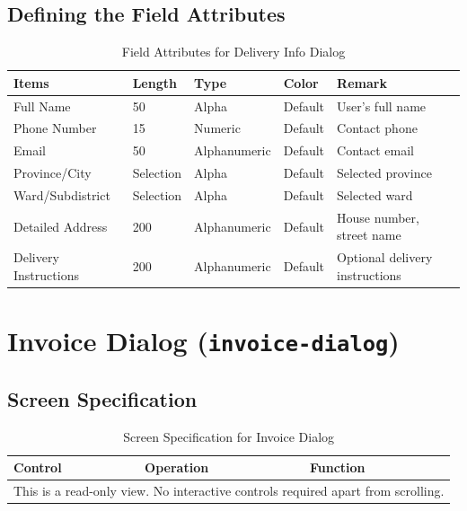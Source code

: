 \documentclass{article}
\begin{document}
\subsection{Defining the Field Attributes}
\begin{table}[h!]
\centering
\begin{tabularx}{\textwidth}{|l|l|l|l|X|}
\hline
\textbf{Items} & \textbf{Length} & \textbf{Type} & \textbf{Color} & \textbf{Remark} \\
\hline
Full Name & 50 & Alpha & Default & User's full name \\
\hline
Phone Number & 15 & Numeric & Default & Contact phone \\
\hline
Email & 50 & Alphanumeric & Default & Contact email \\
\hline
Province/City & Selection & Alpha & Default & Selected province \\
\hline
Ward/Subdistrict & Selection & Alpha & Default & Selected ward \\
\hline
Detailed Address & 200 & Alphanumeric & Default & House number, street name \\
\hline
Delivery Instructions & 200 & Alphanumeric & Default & Optional delivery instructions \\
\hline
\end{tabularx}
\caption{Field Attributes for Delivery Info Dialog}
\end{table}

\section{Invoice Dialog (\texttt{invoice-dialog})}
\subsection{Screen Specification}
\begin{table}[h!]
\centering
\begin{tabularx}{\textwidth}{|l|l|X|}
\hline
\textbf{Control} & \textbf{Operation} & \textbf{Function} \\
\hline
\multicolumn{3}{|c|}{This is a read-only view. No interactive controls required apart from scrolling.} \\
\hline
\end{tabularx}
\caption{Screen Specification for Invoice Dialog}
\end{table}
\end{document}
